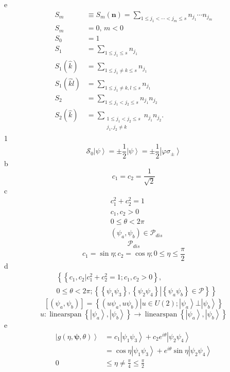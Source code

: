 \documentclass[aps,preprint]{revtex4}%
\begin{document}
e%
\begin{align*}
S_{m}  &  \equiv S_{m}\left(  \mathbf{n}\right)  =\sum_{1\leq j_{1}%
<\cdots<j_{m}\leq s}n_{j_{1}}\cdots n_{j_{m}}\\
S_{m}  &  =0,\,m<0\\
S_{0}  &  =1\\
S_{1}  &  =\sum_{1\leq j_{1}\leq s}n_{j_{1}}\\
S_{1}\left(  \hat{k}\right)   &  =\sum_{1\leq j_{1}\neq k\leq s}n_{j_{1}}\\
S_{1}\left(  \hat{k}\hat{l}\right)   &  =\sum_{1\leq j_{1}\neq k,l\leq
s}n_{j_{1}}\\
S_{2}  &  =\sum_{1\leq j_{1}<j_{2}\leq s}n_{j_{1}}n_{j_{2}}\\
S_{2}\left(  \hat{k}\right)   &  =\sum_{\substack{1\leq j_{1}<j_{2}\leq
s\\j_{1},j_{2}\neq k}}n_{j_{1}}n_{j_{2}}.
\end{align*}
1%
\[
\mathcal{S}_{0}\left\vert \psi\right\rangle =\pm\frac{1}{2}\left\vert
\psi\right\rangle =\pm\frac{1}{2}\left\vert \varphi\sigma_{\pm}\right\rangle
\]
b%
\[
c_{1}=c_{2}=\frac{1}{\sqrt{2}}%
\]
c%
\begin{align*}
&  c_{1}^{2}+c_{2}^{2}=1\\
&  c_{1},c_{2}>0\\
&  0\leq\theta<2\pi\\
&  \left(  \psi_{a},\psi_{b}\right)  \in\mathcal{P}_{dis}%
\end{align*}%
\[
\mathcal{P}_{dis}%
\]%
\[
c_{1}=\sin\eta;c_{2}=\cos\eta;0\leq\eta\leq\frac{\pi}{2}%
\]
d%
\begin{align*}
&  \left\{  \left\{  \left.  c_{1},c_{2}\right\vert c_{1}^{2}+c_{2}%
^{2}=1;c_{1},c_{2}>0\right\}  ,\right. \\
&  \left.  0\leq\theta<2\pi;\left\{  \left.  \left\{  \psi_{1}\psi
_{3}\right\}  ,\left\{  \psi_{2}\psi_{4}\right\}  \right\vert \left\{
\psi_{a}\psi_{b}\right\}  \in\mathcal{P}\right\}  \right\}
\end{align*}%
\[
\left[  \left(  \psi_{a},\psi_{b}\right)  \right]  =\left\{  \left.  \left(
u\psi_{a},u\psi_{b}\right)  \right\vert u\in U\left(  2\right)  ;\left\vert
\psi_{a}\right\rangle \bot\left\vert \psi_{b}\right\rangle \right\}
\]%
\[
u:\operatorname*{linearspan}\left\{  \left\vert \psi_{a}\right\rangle
,\left\vert \psi_{b}\right\rangle \right\}  \rightarrow
\operatorname*{linearspan}\left\{  \left\vert \psi_{a}\right\rangle
,\left\vert \psi_{b}\right\rangle \right\}
\]
e%
\begin{align*}
\left\vert g\left(  \eta,\mathbf{\psi,}\theta\right)  \right\rangle  &
=c_{1}\left\vert \psi_{1}\psi_{3}\right\rangle +c_{2}e^{i\theta}\left\vert
\psi_{2}\psi_{4}\right\rangle \\
&  =\cos\eta\left\vert \psi_{1}\psi_{3}\right\rangle +e^{i\theta}\sin
\eta\left\vert \psi_{2}\psi_{4}\right\rangle \\
0  &  \leq\eta\neq\frac{\pi}{4}\leq\frac{\pi}{2}%
\end{align*}%
\end{document}
